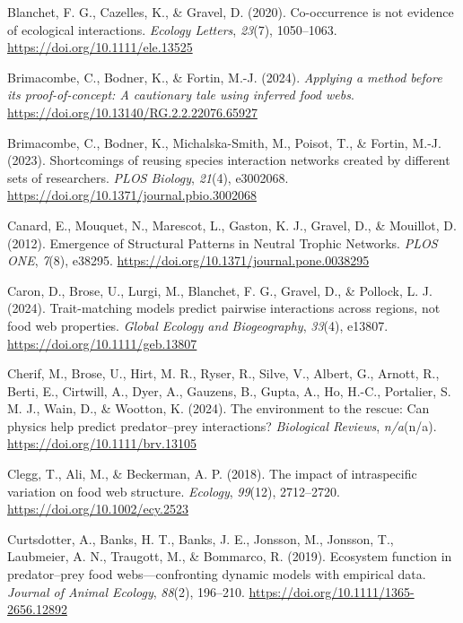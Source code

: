 \documentclass[
]{article}
\newlength{\cslhangindent}
\newenvironment{CSLReferences}[2] %
 {\begin{list}{}{%
  \setlength{\itemindent}{0pt}
  \setlength{\leftmargin}{0pt}
  \setlength{\parsep}{0pt}
  \ifodd #1
   \setlength{\leftmargin}{\cslhangindent}
   \setlength{\itemindent}{-1\cslhangindent}
  \fi
  \setlength{\itemsep}{#2\baselineskip}}}
 {\end{list}}
\begin{document}
\begin{CSLReferences}{1}{0}
Blanchet, F. G., Cazelles, K., \& Gravel, D. (2020). Co-occurrence is
not evidence of ecological interactions. \emph{Ecology Letters},
\emph{23}(7), 1050--1063. \url{https://doi.org/10.1111/ele.13525}

Brimacombe, C., Bodner, K., \& Fortin, M.-J. (2024). \emph{Applying a
method before its proof-of-concept: {A} cautionary tale using inferred
food webs}. \url{https://doi.org/10.13140/RG.2.2.22076.65927}

Brimacombe, C., Bodner, K., Michalska-Smith, M., Poisot, T., \& Fortin,
M.-J. (2023). Shortcomings of reusing species interaction networks
created by different sets of researchers. \emph{PLOS Biology},
\emph{21}(4), e3002068.
\url{https://doi.org/10.1371/journal.pbio.3002068}

Canard, E., Mouquet, N., Marescot, L., Gaston, K. J., Gravel, D., \&
Mouillot, D. (2012). Emergence of {Structural Patterns} in {Neutral
Trophic Networks}. \emph{PLOS ONE}, \emph{7}(8), e38295.
\url{https://doi.org/10.1371/journal.pone.0038295}

Caron, D., Brose, U., Lurgi, M., Blanchet, F. G., Gravel, D., \&
Pollock, L. J. (2024). Trait-matching models predict pairwise
interactions across regions, not food web properties. \emph{Global
Ecology and Biogeography}, \emph{33}(4), e13807.
\url{https://doi.org/10.1111/geb.13807}

Cherif, M., Brose, U., Hirt, M. R., Ryser, R., Silve, V., Albert, G.,
Arnott, R., Berti, E., Cirtwill, A., Dyer, A., Gauzens, B., Gupta, A.,
Ho, H.-C., Portalier, S. M. J., Wain, D., \& Wootton, K. (2024). The
environment to the rescue: Can physics help predict predator--prey
interactions? \emph{Biological Reviews}, \emph{n/a}(n/a).
\url{https://doi.org/10.1111/brv.13105}

Clegg, T., Ali, M., \& Beckerman, A. P. (2018). The impact of
intraspecific variation on food web structure. \emph{Ecology},
\emph{99}(12), 2712--2720. \url{https://doi.org/10.1002/ecy.2523}

Curtsdotter, A., Banks, H. T., Banks, J. E., Jonsson, M., Jonsson, T.,
Laubmeier, A. N., Traugott, M., \& Bommarco, R. (2019). Ecosystem
function in predator--prey food webs---confronting dynamic models with
empirical data. \emph{Journal of Animal Ecology}, \emph{88}(2),
196--210. \url{https://doi.org/10.1111/1365-2656.12892}


\end{CSLReferences}
\end{document}
